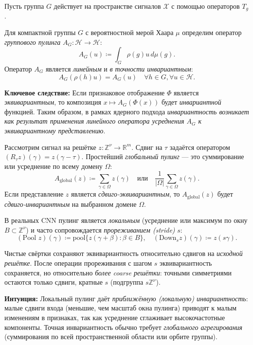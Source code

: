 \documentclass[../NDCNNAI_main.tex]{subfiles}
\begin{document}
Пусть группа \( G \) действует на пространстве сигналов \(\mathcal{X}\) с помощью операторов \( T_g \).
\begin{definition}
\label{def:group_pooling}
Для компактной группы \( G \) с вероятностной мерой Хаара \( \mu \) определим оператор \emph{группового пулинга} \( A_G: \mathcal{H} \to \mathcal{H} \):
\[
A_G(u) \coloneq \int_G \rho(g) u \, d\mu(g).
\]
Оператор \( A_G \) является \emph{линейным} и \emph{в точности инвариантным}:
\[
A_G(\rho(h) u) = A_G(u) \quad \forall h \in G, \forall u \in \mathcal{H}.
\]
\end{definition}
\textbf{Ключевое следствие:} Если признаковое отображение \( \Phi \) является \emph{эквивариантным}, то композиция \( x \mapsto A_G(\Phi(x)) \) будет \emph{инвариантной} функцией. Таким образом, в рамках ядерного подхода \cite{Bietti_Group} \emph{инвариантность возникает как результат применения линейного оператора усреднения \( A_G \) к эквивариантному представлению}.

\begin{example}
Рассмотрим сигнал на решётке \( z\colon \mathbb{Z}^\nu \to \mathbb{R}^m \). Сдвиг на \( \tau \) задаётся оператором \( (R_\tau z)(\gamma) = z(\gamma - \tau) \). Простейший \emph{глобальный пулинг} --- это суммирование или усреднение по всему домену \( \Omega \):
\[
A_{\text{global}}(z) \coloneq \sum_{\gamma \in \Omega} z(\gamma) \quad \text{или} \quad \frac{1}{|\Omega|} \sum_{\gamma \in \Omega} z(\gamma).
\]
Если представление \( z \) является \emph{сдвиго-эквивариантным}, то \( A_{\text{global}}(z) \) будет \emph{сдвиго-инвариантным} на выбранном домене \( \Omega \).   
\end{example}

В реальных CNN пулинг является \emph{локальным} (усреднение или максимум по окну \( B \subset \mathbb{Z}^\nu \)) и часто сопровождается \emph{прореживанием (stride)} \( s \):
\[
(\text{Pool } z)(\gamma) \coloneq \text{pool}\{z(\gamma + \beta) : \beta \in B\}, \quad (\text{Down}_s z)(\gamma) \coloneq z(s\gamma).
\]

\begin{proposition}
Чистые свёртки сохраняют эквивариантность относительно сдвигов на \emph{исходной решётке}. После операции прореживания с шагом \( s \) эквивариантность сохраняется, но относительно \emph{более coarse решётки}: точными симметриями остаются только сдвиги, кратные \( s \) (подгруппа \( s\mathbb{Z}^\nu \)).
\end{proposition}
\textbf{Интуиция:} Локальный пулинг даёт \emph{приближённую (локальную) инвариантность}: малые сдвиги входа (меньшие, чем масштаб окна пулинга) приводят к малым изменениям в признаках, так как усреднение сглаживает высокочастотные компоненты. Точная инвариантность обычно требует \emph{глобального агрегирования} (суммирования по всей пространственной области или орбите группы).
\end{document}
